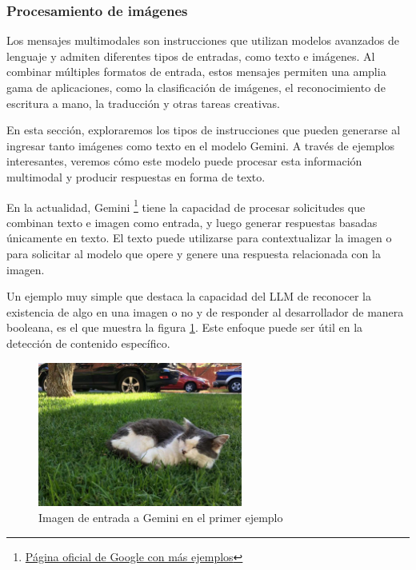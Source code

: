 \subsubsection{Procesamiento de imágenes}

Los mensajes multimodales son instrucciones que utilizan modelos avanzados de lenguaje y admiten diferentes tipos de entradas, como texto e imágenes. Al combinar múltiples formatos de entrada, estos mensajes permiten una amplia gama de aplicaciones, como la clasificación de imágenes, el reconocimiento de escritura a mano, la traducción y otras tareas creativas.

En esta sección, exploraremos los tipos de instrucciones que pueden generarse al ingresar tanto imágenes como texto en el modelo Gemini. A través de ejemplos interesantes, veremos cómo este modelo puede procesar esta información multimodal y producir respuestas en forma de texto.

En la actualidad, Gemini \footnote{\href{https://developers.google.com/solutions/content-driven/ai-images}{Página oficial de Google con más ejemplos}} tiene la capacidad de procesar solicitudes que combinan texto e imagen como entrada, y luego generar respuestas basadas únicamente en texto. El texto puede utilizarse para contextualizar la imagen o para solicitar al modelo que opere y genere una respuesta relacionada con la imagen.

Un ejemplo muy simple que destaca la capacidad del LLM de reconocer la existencia de algo en una imagen o no y de responder al desarrollador de manera booleana, es el que muestra la figura \ref{fig:gemini-1}. Este enfoque puede ser útil en la detección de contenido específico.

\begin{figure}[h]
	\centering
	\includegraphics[width=0.6\textwidth]{Imagenes/ImagenesGemini/gemini-2}
	\caption{Imagen de entrada a Gemini en el primer ejemplo}
	\label{fig:gemini-1}
\end{figure}
 
